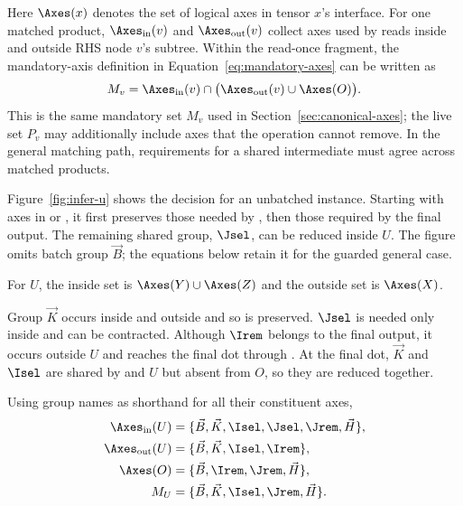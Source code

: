 Here $\Axes(x)$ denotes the set of logical axes in tensor $x$'s interface.
For one matched product, $\Axes_{\mathrm{in}}(v)$ and
$\Axes_{\mathrm{out}}(v)$ collect axes used by reads inside and outside
RHS node $v$'s subtree. Within the read-once fragment, the mandatory-axis
definition in Equation~\eqref{eq:mandatory-axes} can be written as
\begin{equation}
 M_v=\Axes_{\mathrm{in}}(v)\cap
 \bigl(\Axes_{\mathrm{out}}(v)\cup\Axes(O)\bigr).
 \label{eq:keep-axes}
\end{equation}
This is the same mandatory set $M_v$ used in Section~\ref{sec:canonical-axes};
the live set $P_v$ may additionally include axes that the operation cannot
remove. In the general matching path, requirements for a shared intermediate
must agree across matched products.

Figure~\ref{fig:infer-u} shows the decision for an unbatched instance.
Starting with axes in  or , it first preserves those needed
by , then those required by the final output. The remaining shared
group, $\Jsel$, can be reduced inside $U$. The figure omits batch group $\vec B$;
the equations below retain it for the guarded general case.

For $U$, the inside set is $\Axes(Y)\cup\Axes(Z)$ and the outside set is
$\Axes(X)$.

Group $\vec K$ occurs inside and outside and so is preserved. $\Jsel$ is needed
only inside and can be contracted. Although $\Irem$ belongs to the final
output, it occurs outside $U$ and reaches the final dot through .
At the final dot, $\vec K$ and $\Isel$ are shared by  and $U$ but absent
from $O$, so they are reduced together.

Using group names as shorthand for all their constituent axes,
\begin{equation}
\begin{aligned}
 \Axes_{\mathrm{in}}(U)
    &=\{\vec B,\vec K,\Isel,\Jsel,\Jrem,\vec H\},\\
 \Axes_{\mathrm{out}}(U)
    &=\{\vec B,\vec K,\Isel,\Irem\},\\
 \Axes(O)&=\{\vec B,\Irem,\Jrem,\vec H\},\\
 M_{U}&=\{\vec B,\vec K,\Isel,\Jrem,\vec H\}.
\end{aligned}
\end{equation}



